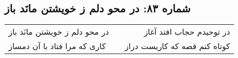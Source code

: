 \begin{center}
\section*{شماره ۸۳: در محو دلم ز خویشتن مانَد باز}
\label{sec:083}
\begin{longtable}{l p{0.5cm} r}
در محو دلم ز خویشتن مانَد باز
&&
در توحیدم حجاب افتد آغاز
\\
کاری که مرا فتاد با آن دمساز
&&
کوتاه کنم قصه که کاریست دراز
\\
\end{longtable}
\end{center}
